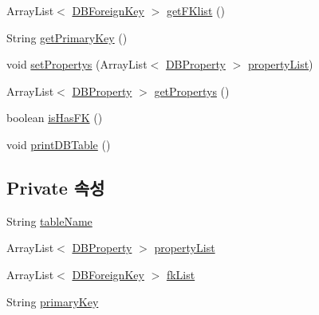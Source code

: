 \begin{DoxyCompactItemize}
\item 
Array\+List$<$ \mbox{\hyperlink{classcom_1_1github_1_1aites_1_1framework_1_1dbcomponent_1_1_d_b_foreign_key}{D\+B\+Foreign\+Key}} $>$ \mbox{\hyperlink{classcom_1_1github_1_1aites_1_1framework_1_1dbcomponent_1_1_d_b_table_af7582b991b622670bcc212eca67a7418}{get\+F\+Klist}} ()
\item 
String \mbox{\hyperlink{classcom_1_1github_1_1aites_1_1framework_1_1dbcomponent_1_1_d_b_table_a175d649e4561015e9ad040e485242148}{get\+Primary\+Key}} ()
\item 
void \mbox{\hyperlink{classcom_1_1github_1_1aites_1_1framework_1_1dbcomponent_1_1_d_b_table_ad1eb994a61eb075f7e09938470660b6e}{set\+Propertys}} (Array\+List$<$ \mbox{\hyperlink{classcom_1_1github_1_1aites_1_1framework_1_1dbcomponent_1_1_d_b_property}{D\+B\+Property}} $>$ \mbox{\hyperlink{classcom_1_1github_1_1aites_1_1framework_1_1dbcomponent_1_1_d_b_table_aaa1e58925c9f05a3cdc868defed1e0de}{property\+List}})
\item 
Array\+List$<$ \mbox{\hyperlink{classcom_1_1github_1_1aites_1_1framework_1_1dbcomponent_1_1_d_b_property}{D\+B\+Property}} $>$ \mbox{\hyperlink{classcom_1_1github_1_1aites_1_1framework_1_1dbcomponent_1_1_d_b_table_aa6ae6fd1b997c0fa4f4cfad781082b2f}{get\+Propertys}} ()
\item 
boolean \mbox{\hyperlink{classcom_1_1github_1_1aites_1_1framework_1_1dbcomponent_1_1_d_b_table_a175465185eeb9e450a69df9ee90a71d0}{is\+Has\+FK}} ()
\item 
void \mbox{\hyperlink{classcom_1_1github_1_1aites_1_1framework_1_1dbcomponent_1_1_d_b_table_a9f9696d7da1da0802724003c7880c129}{print\+D\+B\+Table}} ()
\end{DoxyCompactItemize}
\subsection*{Private 속성}
\begin{DoxyCompactItemize}
\item 
String \mbox{\hyperlink{classcom_1_1github_1_1aites_1_1framework_1_1dbcomponent_1_1_d_b_table_a13baee6ab61eeea3b604d2a7b99b11e7}{table\+Name}}
\item 
Array\+List$<$ \mbox{\hyperlink{classcom_1_1github_1_1aites_1_1framework_1_1dbcomponent_1_1_d_b_property}{D\+B\+Property}} $>$ \mbox{\hyperlink{classcom_1_1github_1_1aites_1_1framework_1_1dbcomponent_1_1_d_b_table_aaa1e58925c9f05a3cdc868defed1e0de}{property\+List}}
\item 
Array\+List$<$ \mbox{\hyperlink{classcom_1_1github_1_1aites_1_1framework_1_1dbcomponent_1_1_d_b_foreign_key}{D\+B\+Foreign\+Key}} $>$ \mbox{\hyperlink{classcom_1_1github_1_1aites_1_1framework_1_1dbcomponent_1_1_d_b_table_ae3a224a5b6fc20939a74e36127103bcc}{fk\+List}}
\item 
String \mbox{\hyperlink{classcom_1_1github_1_1aites_1_1framework_1_1dbcomponent_1_1_d_b_table_a2a972d26ced2f37c2e83625617951e2a}{primary\+Key}}
\end{DoxyCompactItemize}


